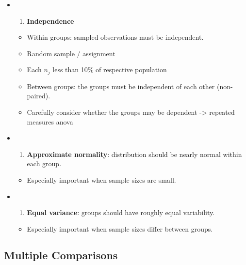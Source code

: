 \documentclass[]{book}
\providecommand{\tightlist}{%
  \setlength{\itemsep}{0pt}\setlength{\parskip}{0pt}}
\begin{document}
\begin{itemize}
\item
  \begin{enumerate}
  \def\labelenumi{(\arabic{enumi})}
  \tightlist
  \item
    \textbf{Independence}
  \end{enumerate}

  \begin{itemize}
  \tightlist
  \item
    Within groups: sampled observations must be independent.
  \item
    Random sample / assignment
  \item
    Each \(n_j\) less than 10\% of respective population
  \item
    Between groups: the groups must be independent of each other (non-paired).
  \item
    Carefully consider whether the groups may be dependent -\textgreater{} repeated measures anova
  \end{itemize}
\item
  \begin{enumerate}
  \def\labelenumi{(\arabic{enumi})}
  \setcounter{enumi}{1}
  \tightlist
  \item
    \textbf{Approximate normality}: distribution should be nearly normal within each group.
  \end{enumerate}

  \begin{itemize}
  \tightlist
  \item
    Especially important when sample sizes are small.
  \end{itemize}
\item
  \begin{enumerate}
  \def\labelenumi{(\arabic{enumi})}
  \setcounter{enumi}{2}
  \tightlist
  \item
    \textbf{Equal variance}: groups should have roughly equal variability.
  \end{enumerate}

  \begin{itemize}
  \tightlist
  \item
    Especially important when sample sizes differ between groups.
  \end{itemize}
\end{itemize}

\hypertarget{multiple-comparisons}{%
\subsection*{Multiple Comparisons}\label{multiple-comparisons}}
\end{document}
